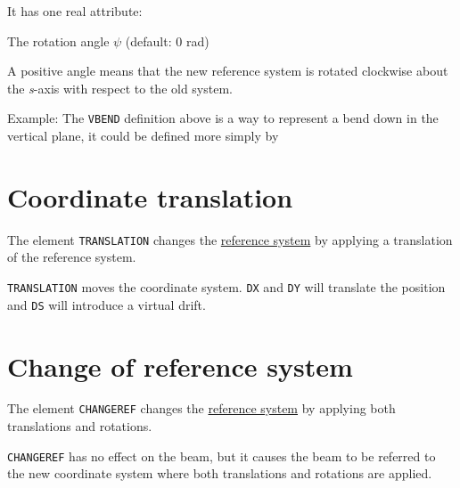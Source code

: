 
It has one real attribute:
\begin{madlist}
    The rotation angle $\psi$ (default: 0 rad)
\end{madlist}

A positive angle means that the new reference system is rotated
clockwise about the \textit{s}-axis with respect to the old system.

Example:
The \texttt{VBEND} definition above is a way to represent a bend down in the
vertical plane, it could be defined more simply by

\section{Coordinate translation}
\label{sec:translation}

The element \texttt{TRANSLATION} changes the
\hyperref[subsec:local-straight]{reference system}
by applying a translation of the reference system.


\texttt{TRANSLATION} moves the coordinate system. \texttt{DX} and \texttt{DY} will translate the position and \texttt{DS} will introduce a virtual drift.

\section{Change of reference system}
\label{sec:changeref}

The element \texttt{CHANGEREF} changes the
\hyperref[subsec:local-straight]{reference system}
by applying both translations and rotations.


\texttt{CHANGEREF} has no effect on the beam, but it causes the beam to
be referred to the new coordinate system where both translations and
rotations are applied.

